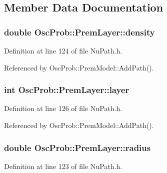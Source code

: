\subsection{Member Data Documentation}
\subsubsection[{\texorpdfstring{density}{density}}]{\setlength{\rightskip}{0pt plus 5cm}double Osc\+Prob\+::\+Prem\+Layer\+::density}\hypertarget{structOscProb_1_1PremLayer_aba2536cbdab87d0db33df47f95c4f2c3}{}\label{structOscProb_1_1PremLayer_aba2536cbdab87d0db33df47f95c4f2c3}


Definition at line 124 of file Nu\+Path.\+h.



Referenced by Osc\+Prob\+::\+Prem\+Model\+::\+Add\+Path().

\subsubsection[{\texorpdfstring{layer}{layer}}]{\setlength{\rightskip}{0pt plus 5cm}int Osc\+Prob\+::\+Prem\+Layer\+::layer}\hypertarget{structOscProb_1_1PremLayer_aca8d7df68e6f982155b68b7e6a7ef389}{}\label{structOscProb_1_1PremLayer_aca8d7df68e6f982155b68b7e6a7ef389}


Definition at line 126 of file Nu\+Path.\+h.



Referenced by Osc\+Prob\+::\+Prem\+Model\+::\+Add\+Path().

\subsubsection[{\texorpdfstring{radius}{radius}}]{\setlength{\rightskip}{0pt plus 5cm}double Osc\+Prob\+::\+Prem\+Layer\+::radius}\hypertarget{structOscProb_1_1PremLayer_a39b409c20fd96a7a0bd421567c00ffed}{}\label{structOscProb_1_1PremLayer_a39b409c20fd96a7a0bd421567c00ffed}


Definition at line 123 of file Nu\+Path.\+h.

